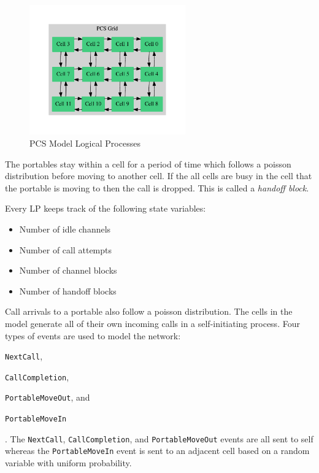 \documentclass[11pt]{book}
\begin{document}
\begin{figure}
    \centering
    \includegraphics[width=0.6\textwidth,quiet]{figs/graphviz/pcs_model.pdf}
    \caption{PCS Model Logical Processes}\label{pcs_model_lps}
\end{figure}

The portables stay within a cell for a period of time which follows a poisson distribution
before moving to another cell.  If the all cells are busy in the cell that the portable
is moving to then the call is dropped.  This is called a \emph{handoff block}.

Every LP keeps track of the following state variables:
\begin{itemize}
    \item Number of idle channels
    \item Number of call attempts
    \item Number of channel blocks
    \item Number of handoff blocks
\end{itemize}

\noindent
Call arrivals to a portable also follow a poisson distribution.  The cells in the model
generate all of their own incoming calls in a self-initiating process.
Four types of events are used to model the network: \begin{inparaenum}[(1)] \item \texttt{NextCall},
\item \texttt{CallCompletion}, \item \texttt{PortableMoveOut}, and \item \texttt{PortableMoveIn}
\end{inparaenum}.  The \texttt{NextCall}, \texttt{CallCompletion}, and \texttt{PortableMoveOut}
events are all sent to self whereas the \texttt{PortableMoveIn} event is sent to an adjacent
cell based on a random variable with uniform probability.
\end{document}
